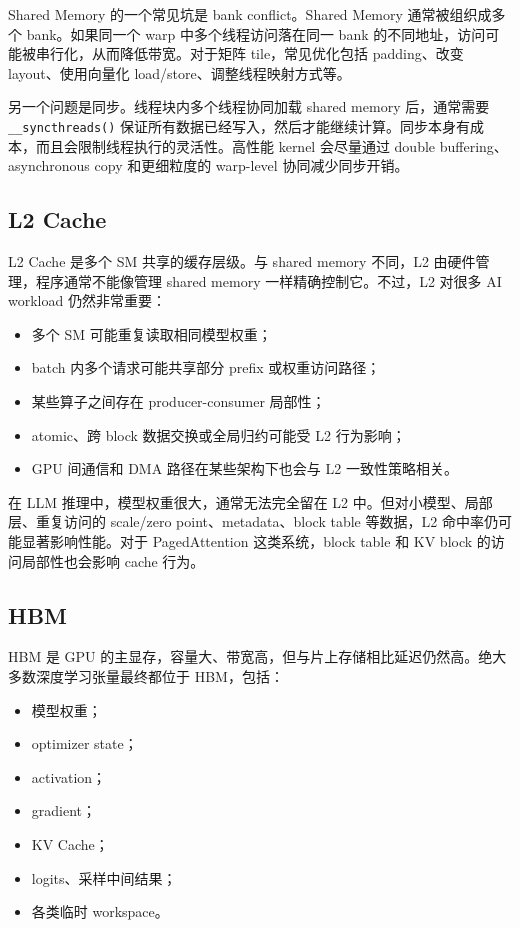 Shared Memory 的一个常见坑是 bank conflict。Shared Memory 通常被组织成多个 bank。如果同一个 warp 中多个线程访问落在同一 bank 的不同地址，访问可能被串行化，从而降低带宽。对于矩阵 tile，常见优化包括 padding、改变 layout、使用向量化 load/store、调整线程映射方式等。

另一个问题是同步。线程块内多个线程协同加载 shared memory 后，通常需要 \texttt{\_\_syncthreads()} 保证所有数据已经写入，然后才能继续计算。同步本身有成本，而且会限制线程执行的灵活性。高性能 kernel 会尽量通过 double buffering、asynchronous copy 和更细粒度的 warp-level 协同减少同步开销。

\subsection{L2 Cache}
\label{subsec:memory-l2}

L2 Cache 是多个 SM 共享的缓存层级。与 shared memory 不同，L2 由硬件管理，程序通常不能像管理 shared memory 一样精确控制它。不过，L2 对很多 AI workload 仍然非常重要：

\begin{itemize}
  \item 多个 SM 可能重复读取相同模型权重；
  \item batch 内多个请求可能共享部分 prefix 或权重访问路径；
  \item 某些算子之间存在 producer-consumer 局部性；
  \item atomic、跨 block 数据交换或全局归约可能受 L2 行为影响；
  \item GPU 间通信和 DMA 路径在某些架构下也会与 L2 一致性策略相关。
\end{itemize}

在 LLM 推理中，模型权重很大，通常无法完全留在 L2 中。但对小模型、局部层、重复访问的 scale/zero point、metadata、block table 等数据，L2 命中率仍可能显著影响性能。对于 PagedAttention 这类系统，block table 和 KV block 的访问局部性也会影响 cache 行为。

\subsection{HBM}
\label{subsec:memory-hbm}

HBM 是 GPU 的主显存，容量大、带宽高，但与片上存储相比延迟仍然高。绝大多数深度学习张量最终都位于 HBM，包括：

\begin{itemize}
  \item 模型权重；
  \item optimizer state；
  \item activation；
  \item gradient；
  \item KV Cache；
  \item logits、采样中间结果；
  \item 各类临时 workspace。
\end{itemize}

